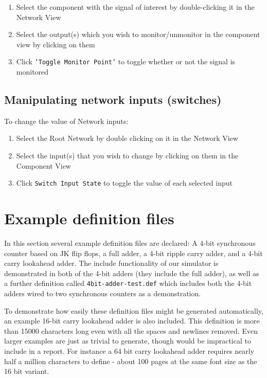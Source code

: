 \documentclass[a4paper]{article}
\begin{document}
        \begin{enumerate}
            \item Select the component with the signal of interest by double-clicking it in the Network View
            \item Select the output(s) which you wish to monitor/unmonitor in the component view by clicking on them
            \item Click \texttt{'Toggle Monitor Point'} to toggle whether or not the signal is monitored
        \end{enumerate}

    \subsection{Manipulating network inputs (switches)}

        To change the value of Network inputs:
        \begin{enumerate}
            \item Select the Root Network by double clicking on it in the Network View
            \item Select the input(s) that you wish to change by clicking on them in the Component View
            \item Click \texttt{Switch Input State} to toggle the value of each selected input
        \end{enumerate}



\clearpage

\section{Example definition files}
    In this section several example definition files are declared: A 4-bit synchronous counter based on JK flip flops, a full adder, a 4-bit ripple carry adder, and a 4-bit carry lookahead adder.
    The include functionality of our simulator is demonstrated in both of the 4-bit adders (they include the full adder), as well as a further definition called \texttt{4bit-adder-test.def} which includes both the 4-bit adders wired to two synchronous counters as a demonstration.

    To demonstrate how easily these definition files might be generated automatically, an example 16-bit carry lookahead adder is also included. This definition is more than 15000 characters long even with all the spaces and newlines removed. Even larger examples are just as trivial to generate, though would be impractical to include in a report. For instance a 64 bit carry lookahead adder requires nearly half a million characters to define - about 100 pages at the same font size as the 16 bit variant.
\end{document}
